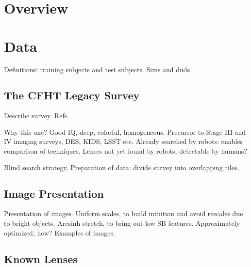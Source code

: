 \documentclass[useAMS,usenatbib,a4paper]{mn2e}
\begin{document}

\section{\sw Overview}
\label{sec:sw}


\section{Data}
\label{sec:data}

Definitions: training subjects and test subjects. Sims and duds.


\subsection{The CFHT Legacy Survey}
\label{sec:data:CFHTLS}

Describe survey. Refs. 

Why this one? Good IQ, deep, colorful, homogeneous. Precursor to Stage III and
IV imaging surveys, DES, KIDS, LSST etc. Already searched by robots: enables
comparison of techniques. Lenses not yet found by robots, detectable by
humans? 

Blind search strategy.
Preparation of data: divide survey into overlapping tiles. 



\subsection{Image Presentation}
\label{sec:data:display}

Presentation of images. Uniform scales, to build intuition and avoid rescales
due to bright objects. Arcsinh stretch, to bring out low SB features. 
Approximately optimized, how? Examples of images.


\subsection{Known Lenses}
\label{sec:data:knownlenses}
\end{document}
